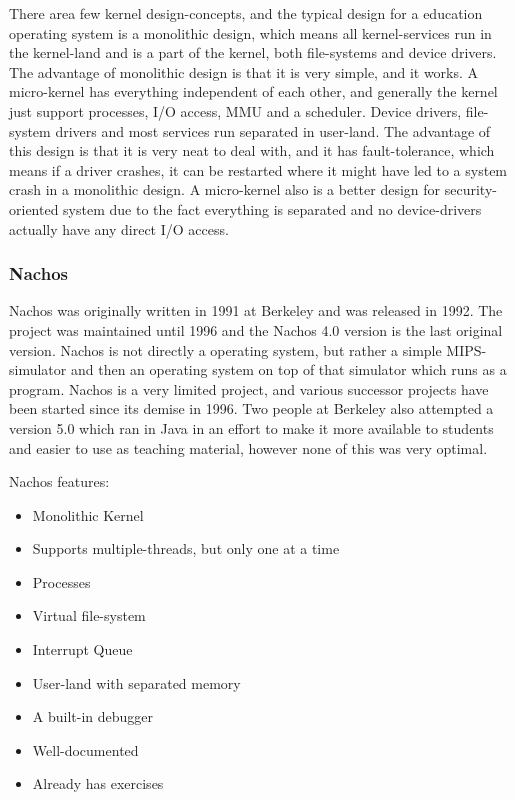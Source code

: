 There area few kernel design-concepts, and the typical design for a education operating system is a monolithic design, which means all kernel-services run in the kernel-land and is a part of the kernel, both file-systems and device drivers. The advantage of monolithic design is that it is very simple, and it works.
A micro-kernel has everything independent of each other, and generally the kernel just support processes, I/O access, MMU and a scheduler. Device drivers, file-system drivers and most services run separated in user-land. The advantage of this design is that it is very neat to deal with, and it has fault-tolerance, which means if a driver crashes, it can be restarted where it might have led to a system crash in a monolithic design. A micro-kernel also is a better design for security-oriented system due to the fact everything is separated and no device-drivers actually have any direct I/O access.

\subsubsection{Nachos}

Nachos was originally written in 1991 at Berkeley and was released in 1992. The project was maintained until 1996 and the Nachos 4.0 version is the last original version. Nachos is not directly a operating system, but rather a simple MIPS-simulator and then an operating system on top of that simulator which runs as a program. Nachos is a very limited project, and various successor projects have been started since its demise in 1996. Two people at Berkeley also attempted a version 5.0 which ran in Java in an effort to make it more available to students and easier to use as teaching material, however none of this was very optimal.

Nachos features\cite{NachosRef}:

\begin{itemize}
  \item Monolithic Kernel
  \item Supports multiple-threads, but only one at a time
  \item Processes
  \item Virtual file-system
  \item Interrupt Queue
  \item User-land with separated memory
  \item A built-in debugger
  \item Well-documented
  \item Already has exercises
\end{itemize}

